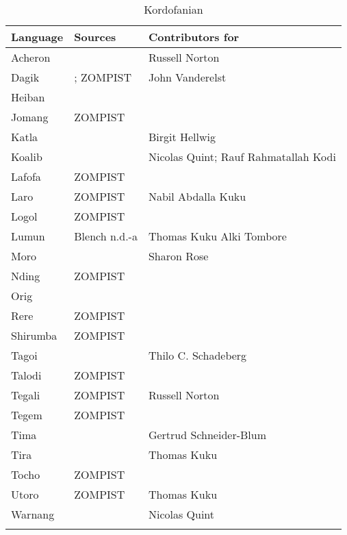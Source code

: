 \begin{table}
\caption{Kordofanian}
\begin{tabularx}{\textwidth}{lQQ}
\lsptoprule
\textbf{Language} & \textbf{Sources} & \textbf{Contributors for \citet{Chan}}\\
\midrule 
Acheron & & Russell Norton \\
Dagik & \citealt{Vanderelst2016}; ZOMPIST & John Vanderelst \\
Heiban & \citealt{Guest1997} & ~ \\
Jomang & ZOMPIST & ~ \\
Katla & & Birgit Hellwig \\
Koalib & & Nicolas Quint; Rauf Rahmatallah Kodi \\
Lafofa & ZOMPIST & ~ \\
Laro & ZOMPIST & Nabil Abdalla Kuku \\
Logol & ZOMPIST & ~ \\
Lumun & Blench n.d.-a & Thomas Kuku Alki Tombore \\
Moro & \citealt{Blench2005} & Sharon Rose \\
Nding & ZOMPIST & ~ \\

Orig &   \citealt{SchadebergElias1979} & ~\\
Rere & ZOMPIST & ~\\
Shirumba & ZOMPIST & ~\\
Tagoi & & Thilo C. Schadeberg\\
Talodi & ZOMPIST & ~\\
Tegali & ZOMPIST & Russell Norton\\
Tegem & ZOMPIST & ~\\
Tima & & Gertrud Schneider-Blum\\
Tira & & Thomas Kuku\\
Tocho & ZOMPIST & ~\\
Utoro & ZOMPIST & Thomas Kuku\\
Warnang & & Nicolas Quint\\

\lspbottomrule
\end{tabularx}
\end{table}



